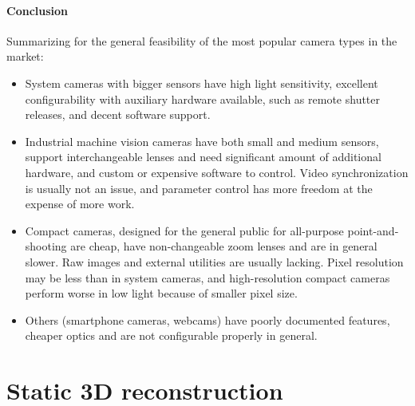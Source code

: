 
\paragraph{Conclusion}
Summarizing for the general feasibility of the most popular camera types in the market:

\begin{itemize}
	\item System cameras with bigger sensors have high light sensitivity, excellent configurability with auxiliary hardware available, such as remote shutter releases, and decent software support.
	\item Industrial machine vision cameras have both small and medium sensors, support interchangeable lenses and need significant amount of additional hardware, and custom or expensive software to control. Video synchronization is usually not an issue, and parameter control has more freedom at the expense of more work.
	\item Compact cameras, designed for the general public for all-purpose point-and-shooting are cheap, have non-changeable zoom lenses and are in general slower. Raw images and external utilities are usually lacking. Pixel resolution may be less than in system cameras, and high-resolution compact cameras perform worse in low light because of smaller pixel size.
	\item Others (smartphone cameras, webcams) have poorly documented features, cheaper optics and are not configurable properly in general.
\end{itemize}



\clearpage
\section{Static 3D reconstruction} \label{sec:static3d} %


